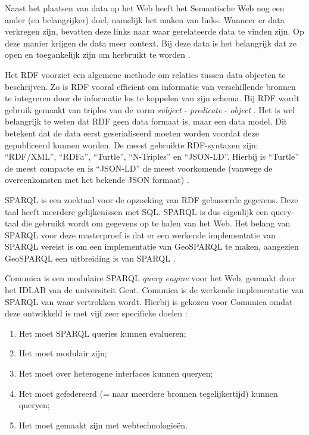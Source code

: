 \documentclass[twocolumn]{phdsymp} %
\begin{document}
Naast het plaatsen van data op het Web heeft het Semantische Web nog een ander (en belangrijker) doel, namelijk het maken van links. Wanneer er data verkregen zijn, bevatten deze links naar waar gerelateerde data te vinden zijn. Op deze manier krijgen de data meer context. Bij deze data is het belangrijk dat ze open en toegankelijk zijn om herbruikt te worden \cite{berners2006linkeddata}.

Het RDF voorziet een algemene methode om relaties tussen data objecten te beschrijven. Zo is RDF vooral efficiënt om informatie van verschillende bronnen te integreren door de informatie los te koppelen van zijn schema. Bij RDF wordt gebruik gemaakt van triples van de vorm \textit{subject} - \textit{predicate} - \textit{object} \cite{lassila1998resource}. Het is wel belangrijk te weten dat RDF geen data formaat is, maar een data model. Dit betekent dat de data eerst geserialiseerd moeten worden voordat deze gepubliceerd kunnen worden. De meest gebruikte RDF-syntaxen zijn: ``RDF/XML'', ``RDFa'', ``Turtle'', ``N-Triples'' en ``JSON-LD''. Hierbij is ``Turtle'' de meest compacte en is ``JSON-LD'' de meest voorkomende (vanwege de overeenkomsten met het bekende JSON formaat) \cite{heath2011linked}.

SPARQL is een zoektaal voor de opzoeking van RDF gebaseerde gegevens. Deze taal heeft meerdere gelijkenissen met SQL. SPARQL is dus eigenlijk een query-taal die gebruikt wordt om gegevens op te halen van het Web. Het belang van SPARQL voor deze masterproef is dat er een werkende implementatie van SPARQL vereist is om een implementatie van GeoSPARQL te maken, aangezien GeoSPARQL een uitbreiding is van SPARQL \cite{sparql2013querylanguage}.

Comunica is een modulaire SPARQL \textit{query engine} voor het Web, gemaakt door het IDLAB van de universiteit Gent. Comunica is de werkende implementatie van SPARQL van waar vertrokken wordt. Hierbij is gekozen voor Comunica omdat deze ontwikkeld is met vijf zeer specifieke doelen \cite{taelman2018comunica}:
\begin{enumerate}
    \item Het moet SPARQL queries kunnen evalueren;
    \item Het moet modulair zijn;
    \item Het moet over heterogene interfaces kunnen queryen;
    \item Het moet gefedereerd (= naar meerdere bronnen tegelijkertijd) kunnen queryen;
    \item Het moet gemaakt zijn met webtechnologieën.
\end{enumerate}
\end{document}
